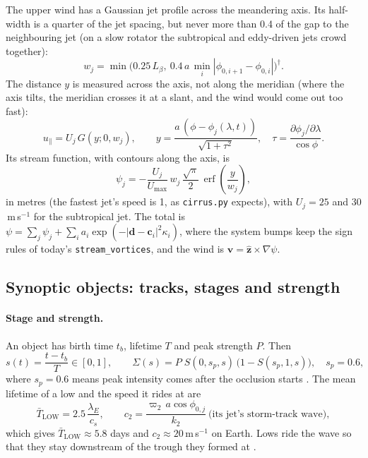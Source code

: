 \documentclass[11pt,a4paper]{article}
\begin{document}
The upper wind has a Gaussian jet profile across the meandering axis. Its half-width is a
quarter of the jet spacing, but never more than 0.4 of the gap to the neighbouring jet (on a slow
rotator the subtropical and eddy-driven jets crowd together):
\begin{equation}
  w_j=\min\!\big(0.25\,L_\beta,\ 0.4\,a\,\min_i|\phi_{0,i+1}-\phi_{0,i}|\big)^\dagger.
\end{equation}
The distance $y$ is measured across the axis, not along the meridian (where the axis tilts, the
meridian crosses it at a slant, and the wind would come out too fast):
\begin{equation}
  u_\parallel = U_j\,G(y;0,w_j),\qquad
  y = \frac{a\,(\phi-\phi_j(\lambda,t))}{\sqrt{1+\tau^2}},\quad
  \tau=\frac{\partial\phi_j/\partial\lambda}{\cos\phi}.
\end{equation}
Its stream function, with contours along the axis, is
\begin{equation}
  \psi_j = -\frac{U_j}{U_{\max}}\,w_j\,\frac{\sqrt{\pi}}{2}\,\operatorname{erf}\!\left(\frac{y}{w_j}\right),
\end{equation}
in metres (the fastest jet's speed is 1, as \texttt{cirrus.py} expects), with
$U_j=25$ and $30$\,m\,s$^{-1}$ for the subtropical jet.
The total is
$\psi=\sum_j\psi_j+\sum_i a_i\exp(-|\mathbf{d}-\mathbf{c}_i|^2\kappa_i)$, where the system
bumps keep the sign rules of today's \texttt{stream\_vortices}, and the wind is
$\mathbf{v}=\hat{\mathbf{z}}\times\nabla\psi$.

\subsection{Synoptic objects: tracks, stages and strength}
\label{sec:eq-objects}
\paragraph{Stage and strength.}
An object has birth time $t_b$, lifetime $T$ and peak strength $P$. Then
\begin{equation}
  s(t)=\frac{t-t_b}{T}\in[0,1],\qquad
  \Sigma(s)=P\;S(0,s_p,s)\,\big(1-S(s_p,1,s)\big),\quad s_p=0.6,
\end{equation}
where $s_p=0.6$ means peak intensity comes after the occlusion starts \cite{schultz2011}.
The mean lifetime of a low and the speed it rides at are
\begin{equation}
  \bar T_{\mathrm{LOW}}=2.5\,\frac{\lambda_E}{c_s},\qquad
  c_2=\frac{\varpi_2\,a\cos\phi_{0,j}}{k_2}\ \text{(its jet's storm-track wave)},
\end{equation}
which gives $\bar T_{\mathrm{LOW}}\approx 5.8$ days and $c_2\approx 20$\,m\,s$^{-1}$ on Earth.
Lows ride the wave so that they stay downstream of the trough they formed at
\cite{uccellini1987}.
\end{document}
